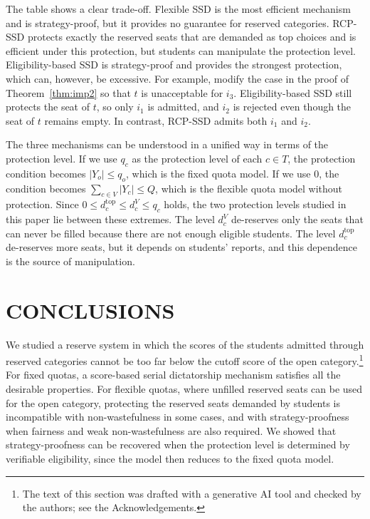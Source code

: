 \documentclass[a4paper,twoside]{article}
\theoremstyle{definition}
\newcommand{\dtop}{d^{\mathrm{top}}}
\newcommand{\dV}{d^{V}}
\newcommand{\aidraft}{\footnote{The text of this section was drafted with a generative AI tool \cite{Anthropic26a} and checked by the authors; see the Acknowledgements.}}
\begin{document}
The table shows a clear trade-off.
Flexible SSD is the most efficient mechanism and is strategy-proof, but it provides no
guarantee for reserved categories.
RCP-SSD protects exactly the reserved seats that are demanded as top choices and is
efficient under this protection, but students can manipulate the protection level.
Eligibility-based SSD is strategy-proof and provides the strongest protection, which
can, however, be excessive.
For example, modify the case in the proof of Theorem~\ref{thm:imp2} so that $t$ is
unacceptable for $i_3$. Eligibility-based SSD still protects the seat of $t$, so only
$i_1$ is admitted, and $i_2$ is rejected even though the seat of $t$ remains empty.
In contrast, RCP-SSD admits both $i_1$ and $i_2$.

The three mechanisms can be understood in a unified way in terms of the protection level.
If we use $q_c$ as the protection level of each $c\in T$, the protection condition
becomes $|Y_o|\le q_o$, which is the fixed quota model.
If we use $0$, the condition becomes $\sum_{c\in V}|Y_c|\le Q$, which is the flexible
quota model without protection.
Since $0\le\dtop_c\le\dV_c\le q_c$ holds, the two protection levels studied in this paper
lie between these extremes.
The level $\dV_c$ de-reserves only the seats that can never be filled because there
are not enough eligible students.
The level $\dtop_c$ de-reserves more seats, but it depends on students' reports, and
this dependence is the source of manipulation.

\section{\uppercase{Conclusions}}
\label{sec:conclusion}

We studied a reserve system in which the scores of the students admitted through reserved
categories cannot be too far below the cutoff score of the open category.\aidraft{}
For fixed quotas, a score-based serial dictatorship mechanism satisfies all the desirable
properties.
For flexible quotas, where unfilled reserved seats can be used for the open category,
protecting the reserved seats demanded by students is incompatible with
non-wastefulness in some cases, and with strategy-proofness when fairness and weak
non-wastefulness are also required.
We showed that strategy-proofness can be recovered when the protection level is
determined by verifiable eligibility, since the model then reduces to the fixed quota
model.
\end{document}
